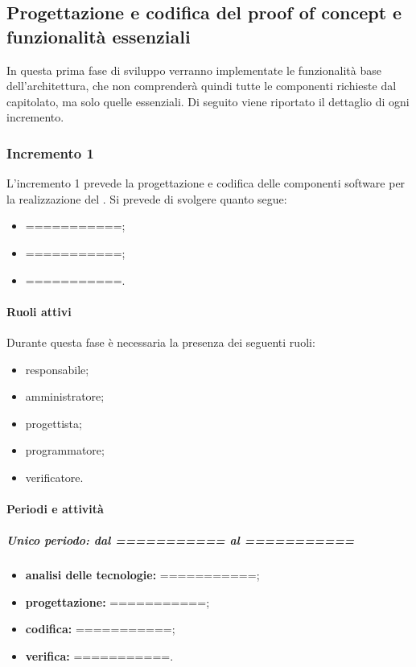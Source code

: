 \newpage 


\newpage %

\subsection{Progettazione e codifica del proof of concept e funzionalità essenziali}
In questa prima fase di sviluppo verranno implementate le funzionalità base dell'architettura, che non comprenderà quindi tutte le componenti richieste dal capitolato, ma solo quelle essenziali.
\newline
Di seguito viene riportato il dettaglio di ogni incremento.

\subsubsection{Incremento 1}
L'incremento 1 prevede la progettazione e codifica delle componenti software per la realizzazione del . Si prevede di svolgere quanto segue:
\begin{itemize}
	\item ===========;
	\item ===========;
	\item ===========.
\end{itemize}

\paragraph{Ruoli attivi}
Durante questa fase è necessaria la presenza dei seguenti ruoli: 
\begin{itemize} 
	\item responsabile; 
	\item amministratore; 
	\item progettista; 
	\item programmatore; 
	\item verificatore.
\end{itemize}

\paragraph{Periodi e attività}
\subparagraph{Unico periodo: dal =========== al ===========}
\begin{itemize}
	\item \textbf{analisi delle tecnologie:} ===========;
	\item \textbf{progettazione:} ===========;
	\item \textbf{codifica:} ===========;
	\item \textbf{verifica:} ===========.
\end{itemize}

